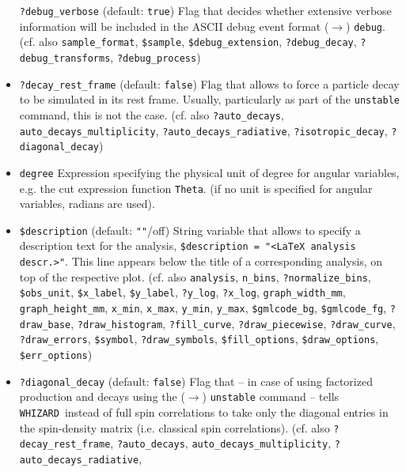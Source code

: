 \documentclass[12pt]{book}
\newcommand{\ttt}[1]{\texttt{#1}}
\newcommand{\whizard}{\texttt{WHIZARD}}
\begin{document}
\begin{itemize}
\ttt{?debug\_verbose} \qquad (default: \ttt{true}) \newline
Flag that decides whether extensive verbose information will be
included in the ASCII debug event format ($\to$)
\ttt{debug}. (cf. also \ttt{sample\_format}, 
\ttt{\$sample}, \ttt{\$debug\_extension}, \ttt{?debug\_decay},
\ttt{?debug\_transforms}, \ttt{?debug\_process})  
\item
\ttt{?decay\_rest\_frame} \qquad (default: \ttt{false}) \newline
Flag that allows to force a particle decay to be simulated in its rest
frame. Usually, particularly as part of the \ttt{unstable} command,
this is not the case. (cf. also \ttt{?auto\_decays},
\ttt{auto\_decays\_multiplicity}, \ttt{?auto\_decays\_radiative},
\ttt{?isotropic\_decay}, \newline \ttt{?diagonal\_decay})
\item
\ttt{degree} \newline
Expression specifying the physical unit of degree for angular
variables, e.g. the cut expression function \ttt{Theta}. (if no unit is
specified for angular variables, radians are used). 
\item
\ttt{\$description} \qquad (default: \ttt{""}/off) \newline
String variable that allows to specify a description text for the
analysis, \ttt{\$description = "<LaTeX analysis descr.>"}.  
This line appears below the title of a corresponding analysis, on top
of the respective plot. 
 (cf. also \ttt{analysis}, 
\ttt{n\_bins}, \ttt{?normalize\_bins}, \ttt{\$obs\_unit}, \ttt{\$x\_label},
\ttt{\$y\_label}, \ttt{?y\_log}, \ttt{?x\_log},
\ttt{graph\_width\_mm}, \ttt{graph\_height\_mm}, 
\ttt{x\_min}, \ttt{x\_max}, \ttt{y\_min}, \ttt{y\_max},
\ttt{\$gmlcode\_bg}, \ttt{\$gmlcode\_fg}, \ttt{?draw\_base},
\ttt{?draw\_histogram}, \ttt{?fill\_curve}, \ttt{?draw\_piecewise}, 
\ttt{?draw\_curve}, \ttt{?draw\_errors}, \ttt{\$symbol}, 
\ttt{?draw\_symbols}, \ttt{\$fill\_options}, \ttt{\$draw\_options},
\ttt{\$err\_options})
\item
\ttt{?diagonal\_decay} \qquad (default: \ttt{false}) \newline
Flag that -- in case of using factorized production and decays using
the ($\to$) \ttt{unstable} command -- tells \whizard\ instead of full
spin correlations to take only the diagonal entries in the
spin-density matrix (i.e. classical spin correlations). (cf. also 
\ttt{?decay\_rest\_frame}, \ttt{?auto\_decays},
\ttt{auto\_decays\_multiplicity}, \ttt{?auto\_decays\_radiative},

\end{itemize}
\end{document}
